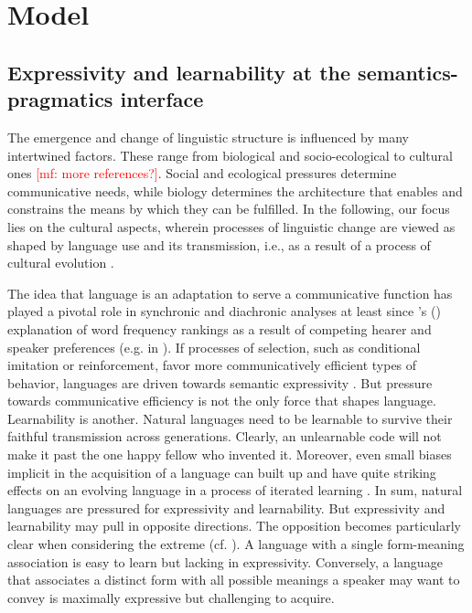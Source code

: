 \documentclass[a4paper]{article}
\newcommand{\citeposs}[2][]{\citeauthor{#2}'s (\citeyear[#1]{#2})}
\newcommand{\mf}[1]{\textcolor{Red}{[mf: #1]}}
\begin{document}
\section{Model}
\label{sec:model}

\subsection{Expressivity and learnability at the semantics-pragmatics interface}

The emergence and change of linguistic structure is influenced by many intertwined
factors. These range from biological and socio-ecological to cultural ones \citep{steels:2011}
\mf{more references?}. Social and ecological pressures determine communicative needs, while
biology determines the architecture that enables and constrains the means by which they can be
fulfilled. In the following, our focus lies on the cultural aspects, wherein processes of
linguistic change are viewed as shaped by language use and its transmission, i.e., as a result
of a process of cultural evolution
\citep{Pagel2009:Human-Language-,ThompsonKirby2016:Culture-Shapes-}.

The idea that language is an adaptation to serve a communicative function has played a pivotal
role in synchronic and diachronic analyses at least since \citeposs{zipf:1949} explanation of
word frequency rankings as a result of competing hearer and speaker preferences (e.g. in
\citealt{martinet:1962, horn:1984,jaeger+vRooij:2007,jaeger:2007,
  piantadosi:2014,kirby+etal:2015}). If processes of selection, such as conditional imitation
or reinforcement, favor more communicatively efficient types of behavior, languages are driven
towards semantic expressivity \citep[e.g.][]{nowak+krakauer:1999,Skyrms2010:Signals}. But
pressure towards communicative efficiency is not the only force that shapes
language. Learnability is another. Natural languages need to be learnable to survive their
faithful transmission across generations. Clearly, an unlearnable code will not make it past
the one happy fellow who invented it. Moreover, even small biases implicit in the acquisition
of a language can built up and have quite striking effects on an evolving language in a process
of iterated learning
\citep{KirbyHurford2002:The-Emergence-o,SmithKirby2003:Iterated-Learni,kirby+etal:2014}. In
sum, natural languages are pressured for expressivity and learnability. But expressivity and
learnability may pull in opposite directions. The opposition becomes particularly clear when
considering the extreme (cf. \citealt{kemp+regier:2012,kirby+etal:2015}). A language with a
single form-meaning association is easy to learn but lacking in expressivity. Conversely, a
language that associates a distinct form with all possible meanings a speaker may want to
convey is maximally expressive but challenging to acquire.
\end{document}
